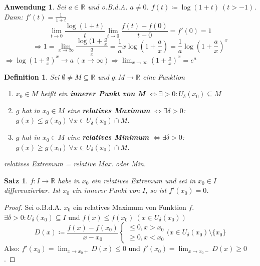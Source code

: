 \documentclass[14pt,titlepage,ngerman,a4paper,headsepline,DIV15,halfparskip*]{scrartcl}
\newcommand{\R}{\mathbb{R}}
\theoremstyle{named}
\theoremstyle{dotless}
\newtheorem{satz}[namedtheorem]{Satz}
\newtheorem{anwendung}[namedtheorem]{Anwendung}
\newtheorem*{definition}{Definition}
\begin{document}
\begin{anwendung} \label{9.5:anwendung}
	Sei $a \in \R$ und o.B.d.A. $a \neq 0$. $f(t) \coloneqq \log(1 + t) ~(t > -1)$. Dann: $f'(t) = \frac{1}{1 + t}$
	$$ \lim_{t \rightarrow 0} \frac{\log(1+t)}{t} \lim_{t \rightarrow 0} \frac{f(t) - f(0)}{t - 0} = f'(0) = 1 $$
	$$ \Rightarrow 1 = \lim_{x \rightarrow \infty} \frac{\log(1 + \frac{a}{x}}{\frac{a}{x}} = \frac{1}{a} x \log(1 + \frac{a}{x}) = \frac{1}{a} \log (1 + \frac{a}{x})^{x} $$
	$\Rightarrow \log (1 + \frac{a}{x})^{x} \rightarrow a ~(x \rightarrow \infty) \Rightarrow \lim_{x \rightarrow \infty} (1 + \frac{a}{x})^{x} = e^{a}$
\end{anwendung}


\begin{definition}
	Sei $\emptyset \neq M \subseteq \R$ und $g \colon M \rightarrow \R$ eine Funktion
	\begin{enumerate}
		\item $x_{0} \in M$ hei{\ss}t ein \textbf{innerer Punkt von M} $\iff \exists > 0: U_{\delta}(x_{0}) \subseteq M$
		\item $g$ hat in $x_{0} \in M$ eine \textbf{relatives Maximum} $\iff \exists \delta > 0$: $g(x) \leq g(x_{0}) ~\forall x \in U_{\delta}(x_{0}) \cap M$.
		\item $g$ hat in $x_{0} \in M$ eine \textbf{relatives Minimum} $\iff \exists \delta > 0$: $g(x) \geq g(x_{0}) ~\forall x \in U_{\delta}(x_{0}) \cap M$.
	\end{enumerate}
	relatives Extremum = relative Max. oder Min.
\end{definition}


\begin{satz} \label{9.6:satz}
	$f \colon I \rightarrow \R$ habe in $x_{0}$ ein relatives Extremum und sei in $x_{0} \in I$ differenzierbar. Ist $x_{0}$ ein innerer Punkt von $I$, so ist $f'(x_{0}) = 0$.
\end{satz}

\begin{proof}
	Sei o.B.d.A. $x_{0}$ ein relatives Maximum von Funktion $f$. $\exists \delta > 0: U_{\delta}(x_{0}) \subseteq I$ und $f(x) \leq f(x_{0}) ~(x \in U_{\delta}(x_{0}))$
	$$ D(x) \coloneqq \frac{f(x) - f(x_{0})}{x - x_{0}} \begin{cases} \leq 0, x > x_{0} \\ \geq 0, x < x_{0} \end{cases} (x \in U_{\delta}(x_{0}) \setminus \{ x_{0} \} $$
	Also: $f'(x_{0}) = \lim_{x \rightarrow x_{0} +} D(x) \leq 0$ und $f'(x_{0}) = \lim_{x \rightarrow x_{0} -} D(x) \geq 0$.
\end{proof}
\end{document}
